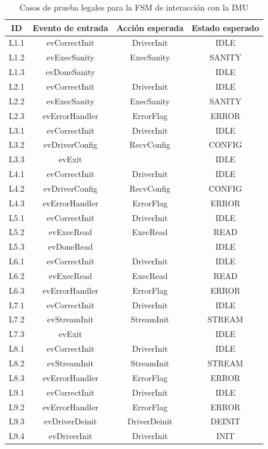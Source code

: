 \documentclass[
11pt, %
codirector, %
]{simple_charter}
\begin{document}
\begin{table}[H]
\centering
\begin{tabular}{|c|c|c|c|}
\hline
\rowcolor[HTML]{EFEFEF}
\textbf{ID} & \textbf{Evento de entrada} & \textbf{Acción esperada} & \textbf{Estado esperado} \\ \hline
L1.1 & evCorrectInit & DriverInit & IDLE \\ \hline
L1.2 & evExecSanity & ExecSanity & SANITY \\ \hline
L1.3 & evDoneSanity &  & IDLE \\ \hline
\rowcolor[HTML]{EFEFEF}
L2.1 & evCorrectInit & DriverInit & IDLE \\ \hline
\rowcolor[HTML]{EFEFEF}
L2.2 & evExecSanity & ExecSanity & SANITY \\ \hline
\rowcolor[HTML]{EFEFEF}
L2.3 & evErrorHandler & ErrorFlag & ERROR \\ \hline
L3.1 & evCorrectInit & DriverInit & IDLE \\ \hline
L3.2 & evDriverConfig & RecvConfig & CONFIG \\ \hline
L3.3 & evExit &  & IDLE \\ \hline
\rowcolor[HTML]{EFEFEF}
L4.1 & evCorrectInit & DriverInit & IDLE \\ \hline
\rowcolor[HTML]{EFEFEF}
L4.2 & evDriverConfig & RecvConfig & CONFIG \\ \hline
\rowcolor[HTML]{EFEFEF}
L4.3 & evErrorHandler & ErrorFlag & ERROR \\ \hline
L5.1 & evCorrectInit & DriverInit & IDLE \\ \hline
L5.2 & evExecRead & ExecRead & READ \\ \hline
L5.3 & evDoneRead &  & IDLE \\ \hline
\rowcolor[HTML]{EFEFEF}
L6.1 & evCorrectInit & DriverInit & IDLE \\ \hline
\rowcolor[HTML]{EFEFEF}
L6.2 & evExecRead & ExecRead & READ \\ \hline
\rowcolor[HTML]{EFEFEF}
L6.3 & evErrorHandler & ErrorFlag & ERROR \\ \hline
L7.1 & evCorrectInit & DriverInit & IDLE \\ \hline
L7.2 & evStreamInit & StreamInit & STREAM \\ \hline
L7.3 & evExit &  & IDLE \\ \hline
\rowcolor[HTML]{EFEFEF}
L8.1 & evCorrectInit & DriverInit & IDLE \\ \hline
\rowcolor[HTML]{EFEFEF}
L8.2 & evStreamInit & StreamInit & STREAM \\ \hline
\rowcolor[HTML]{EFEFEF}
L8.3 & evErrorHandler & ErrorFlag & ERROR \\ \hline
L9.1 & evCorrectInit & DriverInit & IDLE \\ \hline
L9.2 & evErrorHandler & ErrorFlag & ERROR \\ \hline
L9.3 & evDriverDeinit & DriverDeinit & DEINIT \\ \hline
L9.4 & evDriverInit & DriverInit & INIT \\ \hline
\end{tabular}
\caption{Casos de prueba legales para la FSM de interacción con la IMU}
\label{tab:fsm-imu-casos-legales}
\end{table}
\end{document}
